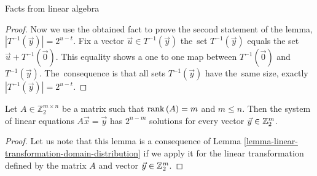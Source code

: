\begin{chapter}{Facts from linear algebra}
\begin{proof}
Now we use the obtained fact to prove the second statement of the lemma, $|T^{-1}(\vec{y})| = 2 ^ {u - t}$. Fix a vector $\vec{u} \in T^{-1}(\vec{y})$ the~set $T^{-1}(\vec{y})$ equals the set $\vec{u} + T^{-1}(\vec{0})$. This equality shows a one to one map between $T^{-1}(\vec{0})$ and $T^{-1}(\vec{y})$. The~consequence is that all sets $T^{-1}(\vec{y})$ have the~same size, exactly $|T^{-1}(\vec{y})| = 2^{u-t}$.
\end{proof}

\begin{lemma}
\label{lemma-system-of-linear-equations-solution-count}
Let $A \in \mathbb{Z}_2^{m \times n}$ be a matrix such that $\mathrm{rank}\left({A}\right) = m$ and $m \leq n$. Then the system of linear equations $A\vec{x} = \vec{y}$ has $2 ^ {n - m}$ solutions for every vector $\vec{y} \in \mathbb{Z}_{2}^{m}$.
\end{lemma}
\begin{proof}
Let us note that this lemma is a consequence of Lemma \ref{lemma-linear-transformation-domain-distribution} if we apply it for the linear transformation defined by the matrix $A$ and vector $\vec{y} \in \mathbb{Z}_{2}^{m}$.



\end{proof}
\end{chapter}
